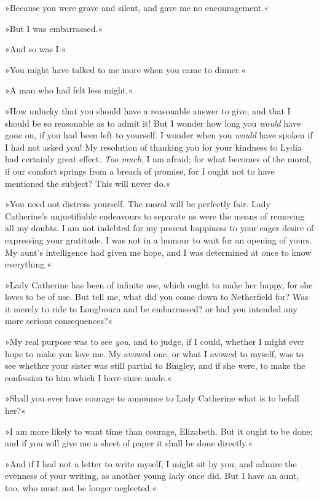 »Because you were grave and silent, and gave me no encouragement.«

»But I was embarrassed.«

»And so was I.«

»You might have talked to me more when you came to dinner.«

»A man who had felt less might.«

»How unlucky that you should have a reasonable answer to give, and that I should be so reasonable as to admit it! But I wonder how long you \textit{would} have gone on, if you had been left to yourself. I wonder when you \textit{would} have spoken if I had not asked you! My resolution of thanking you for your kindness to Lydia had certainly great effect. \textit{Too much}, I am afraid; for what becomes of the moral, if our comfort springs from a breach of promise, for I ought not to have mentioned the subject? This will never do.«

»You need not distress yourself. The moral will be perfectly fair. Lady Catherine's unjustifiable endeavours to separate us were the means of removing all my doubts. I am not indebted for my present happiness to your eager desire of expressing your gratitude. I was not in a humour to wait for an opening of yours. My aunt's intelligence had given me hope, and I was determined at once to know everything.«

»Lady Catherine has been of infinite use, which ought to make her happy, for she loves to be of use. But tell me, what did you come down to Netherfield for? Was it merely to ride to Longbourn and be embarrassed? or had you intended any more serious consequences?«

»My real purpose was to see \textit{you}, and to judge, if I could, whether I might ever hope to make you love me. My avowed one, or what I avowed to myself, was to see whether your sister was still partial to Bingley, and if she were, to make the confession to him which I have since made.«

»Shall you ever have courage to announce to Lady Catherine what is to befall her?«

»I am more likely to want time than courage, Elizabeth. But it ought to be done; and if you will give me a sheet of paper it shall be done directly.«

»And if I had not a letter to write myself, I might sit by you, and admire the evenness of your writing, as another young lady once did. But I have an aunt, too, who must not be longer neglected.«

